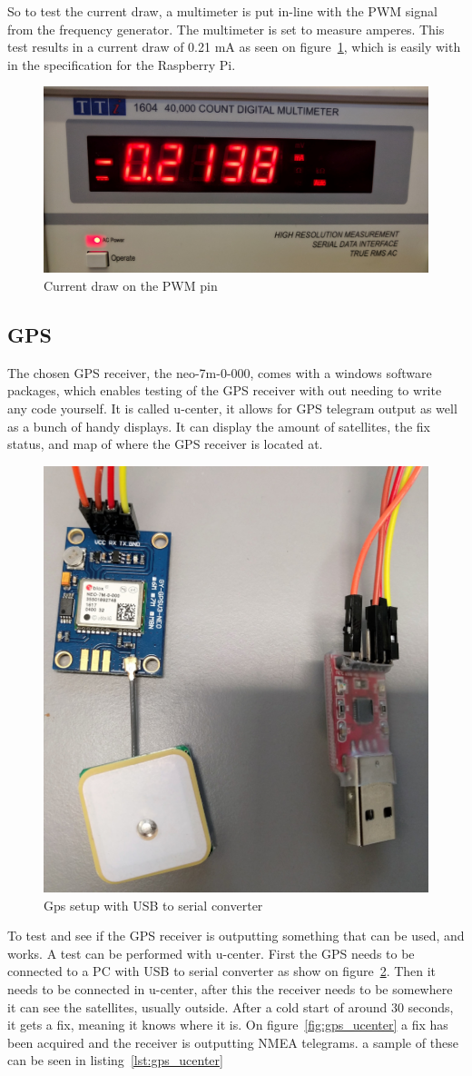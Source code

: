 So to test the current draw, a multimeter is put in-line with the PWM signal from the frequency generator. The multimeter is set to measure amperes. This test results in a current draw of 0.21 mA as seen on figure~\ref{fig:pwmcurrentdraw}, which is easily with in the specification for the Raspberry Pi.

\begin{figure}[H]
\centering
\includegraphics[width=0.4\linewidth]{Images/Implementation/pwm_current_draw}
\caption{Current draw on the PWM pin}
\label{fig:pwmcurrentdraw}
\end{figure}

\subsection{GPS}
The chosen GPS receiver, the neo-7m-0-000, comes with a windows software packages, which enables testing of the GPS receiver with out needing to write any code yourself. It is called u-center, it allows for GPS telegram output as well as a bunch of handy displays. It can display the amount of satellites, the fix status, and map of where the GPS receiver is located at. 

\begin{figure}[H]
\centering
\includegraphics[width=0.4\linewidth]{Images/Implementation/gps_setup}
\caption{Gps setup with USB to serial converter}
\label{fig:gps_test_setup}
\end{figure}


To test and see if the GPS receiver is outputting something that can be used, and works. A test can be performed with u-center. First the GPS needs to be connected to a PC with USB to serial converter as show on figure~\ref{fig:gps_test_setup}. Then it needs to be connected in u-center, after this the receiver needs to be somewhere it can see the satellites, usually outside. After a cold start of around 30 seconds, it gets a fix, meaning it knows where it is. On figure~\ref{fig:gps_ucenter} a fix has been acquired and the receiver is outputting NMEA telegrams. a sample of these can be seen in listing~\ref{lst:gps_ucenter}


